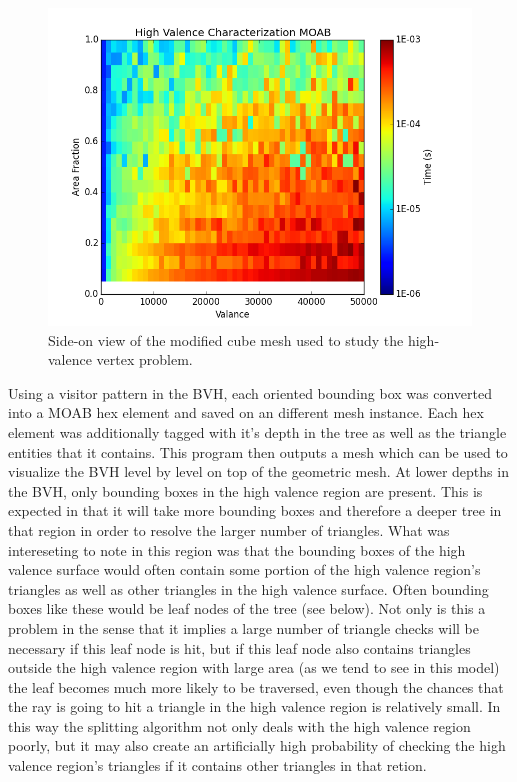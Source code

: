 \documentclass[10pt, a4paper]{article}
\begin{document}
\begin{figure}[H]
  \centering
    \includegraphics[scale=0.35]{hv_study_MOAB.png}
    \caption{Side-on view of the modified cube mesh used to study the high-valence vertex problem.}
\end{figure}

Using a visitor pattern in the BVH, each oriented bounding box was converted into a MOAB hex element and saved on an different mesh instance. Each hex element was additionally tagged with it's depth in the tree as well as the triangle entities that it contains. This program then outputs a mesh which can be used to visualize the BVH level by level on top of the geometric mesh. At lower depths in the BVH, only bounding boxes in the high valence region are present. This is expected in that it will take more bounding boxes and therefore a deeper tree in that region in order to resolve the larger number of triangles. What was intereseting to note in this region was that the bounding boxes of the high valence surface would often contain some portion of the high valence region's triangles as well as other triangles in the high valence surface. Often bounding boxes like these would be leaf nodes of the tree (see below). Not only is this a problem in the sense that it implies a large number of triangle checks will be necessary if this leaf node is hit, but if this leaf node also contains triangles outside the high valence region with large area (as we tend to see in this model) the leaf becomes much more likely to be traversed, even though the chances that the ray is going to hit a triangle in the high valence region is relatively small. In this way the splitting algorithm not only deals with the high valence region poorly, but it may also create an artificially high probability of checking the high valence region's triangles if it contains other triangles in that retion.
\end{document}
